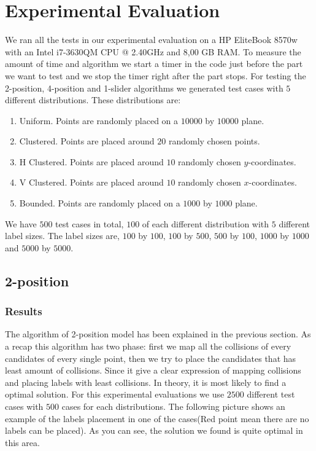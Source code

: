 \documentclass[crop=false,a4paper,oneside,11pt]{standalone}
\begin{document}
\section{Experimental Evaluation}

We ran all the tests in our experimental evaluation on a HP EliteBook 8570w with an Intel i7-3630QM CPU @ 2.40GHz and 8,00 GB RAM. To measure the amount of time and algorithm we start a timer in the code just before the part we want to test and we stop the timer right after the part stops. For testing the 2-position, 4-position and 1-slider algorithms we generated test cases with $5$ different distributions. These distributions are:
\begin{enumerate}
    \item Uniform. Points are randomly placed on a $10000$ by $10000$ plane.
    \item Clustered. Points are placed around $20$ randomly chosen points.
    \item H Clustered. Points are placed around $10$ randomly chosen $y$-coordinates.
    \item V Clustered. Points are placed around $10$ randomly chosen $x$-coordinates.
    \item Bounded. Points are randomly placed on a $1000$ by $1000$ plane.
\end{enumerate}
We have $500$ test cases in total, $100$ of each different distribution with $5$ different label sizes. The label sizes are, $100$ by $100$, $100$ by $500$, $500$ by $100$, $1000$ by $1000$ and $5000$ by $5000$.

\subsection{2-position}
\subsubsection{Results}
The algorithm of 2-position model has been explained in the previous section. As a recap this algorithm has two phase: first we map all the collisions of every candidates of every single point, then we try to place the candidates that has least amount of collisions. Since it give a clear expression of mapping collisions and placing labels with least collisions. In theory, it is most likely to find a optimal solution. For this experimental evaluations we use $2500$ different test cases with $500$ cases for each distributions. The following picture shows an example of the labels placement in one of the cases(Red point mean there are no labels can be placed). As you can see, the solution we found is quite optimal in this area.
\end{document}
